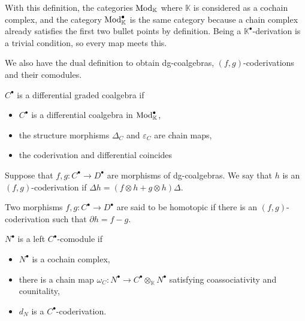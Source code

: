 \documentclass[../thesis.tex]{subfiles}
\begin{document}
            With this definition, the categories $\tt{Mod}_\mathbb{K}$ where $\mathbb{K}$ is considered as a cochain complex, and the category $\tt{Mod}_\mathbb{K}^\bullet$ is the same category because a chain complex already satisfies the first two bullet points by definition. Being a $\mathbb{K}^\bullet$-derivation is a trivial condition, so every map meets this.

            We also have the dual definition to obtain dg-coalgebras, $(f,g)$-coderivations and their comodules.
            
            \begin{definition}
                $C^{\bullet}$ is a differential graded coalgebra if
                \begin{itemize}
                    \item $C^\bullet$ is a differential coalgebra in $\tt{Mod}_\mathbb{K}^\bullet$,
                    \item the structure morphisms $\Delta_C$ and $\varepsilon_C$ are chain maps,
                    \item the coderivation and differential coincides
                \end{itemize}
            \end{definition}

            \begin{definition}
                Suppose that $f,g: C^\bullet \rightarrow D^\bullet$ are morphisms of dg-coalgebras. We say that $h$ is an $(f,g)$-coderivation if $\Delta h = (f \otimes h + g \otimes h) \Delta$.
            \end{definition}

            Two morphisms $f,g: C^\bullet \rightarrow D^\bullet$ are said to be homotopic if there is an $(f,g)$-coderivation such that $\partial h = f - g$.

            \begin{definition}
                $N^\bullet$ is a left $C^\bullet$-comodule if
                \begin{itemize}
                    \item $N^\bullet$ is a cochain complex,
                    \item there is a chain map $\omega_C : N^\bullet \rightarrow C^\bullet \otimes_\mathbb{K} N^\bullet$ satisfying coassociativity and counitality,
                    \item $d_N$ is a $C^\bullet$-coderivation.
                \end{itemize}
            \end{definition}
\end{document}
